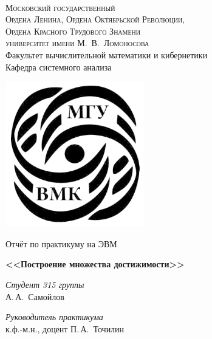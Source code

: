 \documentclass{article}
\theoremstyle{definition}
\begin{document}
	
	\thispagestyle{empty}
	
	\begin{center}
		\ \vspace{-3cm}
		
		{\scshape Московский государственный\\
		Ордена Ленина, Ордена Октябрьской Революции,\\
		Ордена Красного Трудового Знамени\\
		университет имени М.~В.~Ломоносова}\\
		Факультет вычислительной математики и кибернетики\\
		Кафедра системного анализа
		
		\vspace{1cm}
		\begin{center}
		{\includegraphics[width=6cm]{mgu}}
		\end{center}
		\vspace{1cm}
		
		{\LARGE Отчёт по практикуму на ЭВМ}
		
		\vspace{1cm}
		
		{\Huge\bfseries <<Построение множества достижимости>>}
		\end{center}
		
		\vspace{1cm}
		
		\begin{flushright}
		  \large
		  \textit{Студент 315 группы}\\
		  А.\,А.~Самойлов
		
		  \vspace{5mm}
		
		  \textit{Руководитель практикума}\\
		  к.ф.-м.н., доцент П.\,А.~Точилин
		\end{flushright}
		
\end{document}
